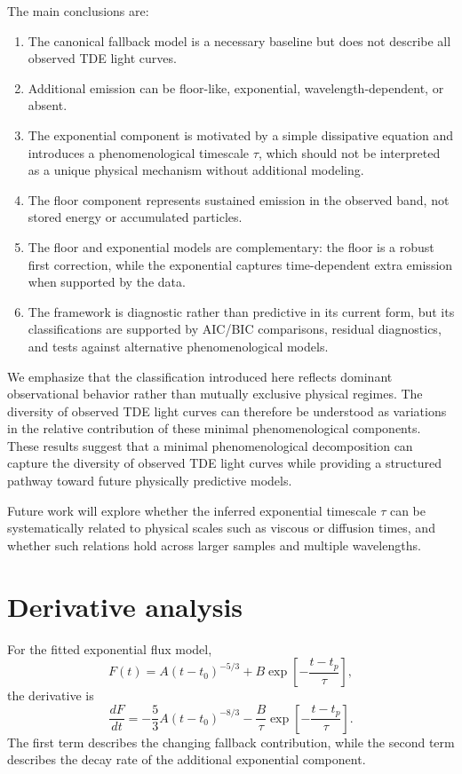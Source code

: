 \documentclass[11pt]{article}
\begin{document}
The main conclusions are:
\begin{enumerate}[label=(\roman*)]
\item The canonical fallback model is a necessary baseline but does not describe all observed TDE light curves.
\item Additional emission can be floor-like, exponential, wavelength-dependent, or absent.
\item The exponential component is motivated by a simple dissipative equation and introduces a phenomenological timescale $\tau$, which should not be interpreted as a unique physical mechanism without additional modeling.
\item The floor component represents sustained emission in the observed band, not stored energy or accumulated particles.
\item The floor and exponential models are complementary: the floor is a robust first correction, while the exponential captures time-dependent extra emission when supported by the data.
\item The framework is diagnostic rather than predictive in its current form, but its classifications are supported by AIC/BIC comparisons, residual diagnostics, and tests against alternative phenomenological models.
\end{enumerate}

We emphasize that the classification introduced here reflects dominant observational behavior rather than mutually exclusive physical regimes. The diversity of observed TDE light curves can therefore be understood as variations in the relative contribution of these minimal phenomenological components. These results suggest that a minimal phenomenological decomposition can capture the diversity of observed TDE light curves while providing a structured pathway toward future physically predictive models.

Future work will explore whether the inferred exponential timescale $\tau$ can be systematically related to physical scales such as viscous or diffusion times, and whether such relations hold across larger samples and multiple wavelengths.

\appendix
\section{Derivative analysis}
For the fitted exponential flux model,
\begin{equation}
F(t)=A(t-t_0)^{-5/3}+B\exp\left[-\frac{t-t_p}{\tau}\right],
\end{equation}
the derivative is
\begin{equation}
\frac{dF}{dt}=-\frac{5}{3}A(t-t_0)^{-8/3}-\frac{B}{\tau}\exp\left[-\frac{t-t_p}{\tau}\right].
\end{equation}
The first term describes the changing fallback contribution, while the second term describes the decay rate of the additional exponential component.
\end{document}
